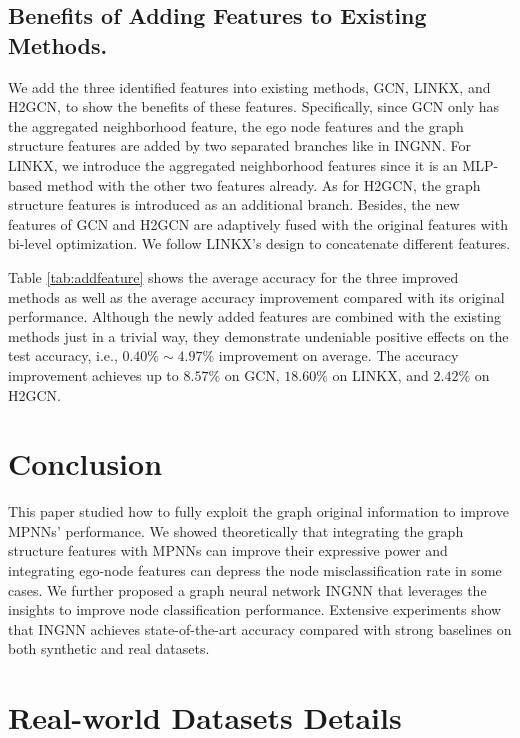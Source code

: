 \documentclass{article}
\theoremstyle{plain}
\newcommand{\pjn}{{INGNN}}
\begin{document}
\subsection{Benefits of Adding Features to Existing Methods.} \label{sec:AddAnalysis}
We add the three identified features into existing methods, GCN, LINKX, and H2GCN, to show the benefits of these features. Specifically, since GCN only has the aggregated neighborhood feature, the ego node features and the graph structure features are added by two separated branches like in \pjn. For LINKX, we introduce the aggregated neighborhood features since it is an MLP-based method with the other two features already. As for H2GCN, the graph structure features is introduced as an additional branch. Besides, the new features of GCN and H2GCN are adaptively fused with the original features with bi-level optimization. We follow LINKX's design to concatenate different features.

Table \ref{tab:addfeature} shows the average accuracy for the three improved methods as well as the average accuracy improvement compared with its original performance. Although the newly added features are combined with the existing methods just in a trivial way, they demonstrate undeniable positive effects on the test accuracy, i.e., $0.40\% \sim 4.97\%$ improvement on average. The accuracy improvement achieves up to $8.57\%$ on GCN, $18.60\%$ on LINKX, and $2.42\%$ on H2GCN.


\section{Conclusion}\label{sect:conclusion}
This paper studied how to fully exploit the graph original information to improve MPNNs' performance. 
We showed theoretically that integrating the graph structure features with MPNNs can improve their expressive power and integrating ego-node features can depress the node misclassification rate in some cases.
We further proposed a graph neural network \pjn{} that leverages the insights to improve node classification performance.
Extensive experiments show that \pjn{} achieves state-of-the-art accuracy compared with strong baselines on both synthetic and real datasets. 



\small







\newpage
\appendix
\onecolumn
\section{Real-world Datasets Details}\label{sect:app-dataset-details}
\end{document}
